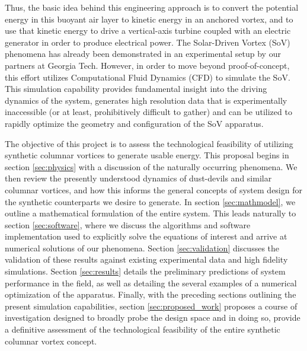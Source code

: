 Thus, the basic idea behind this engineering approach is to convert the 
potential energy in this buoyant air layer to kinetic energy in an
anchored vortex, and to use that kinetic energy to drive a
vertical-axis turbine coupled with an electric generator in order to
produce electrical power. 
The Solar-Driven Vortex (SoV) phenomena has already been demonstrated in
an experimental setup by our partners at Georgia Tech. However, in order to 
move beyond proof-of-concept, this effort utilizes Computational Fluid 
Dynamics (CFD) to simulate the SoV. This simulation capability provides 
fundamental insight into the 
driving dynamics of the system, generates high resolution data that is 
experimentally inaccessible (or at least, prohibitively difficult to gather) 
and can be utilized to rapidly optimize the geometry and configuration of 
the SoV apparatus. 


%
%

The objective of this project is to assess the technological feasibility of 
utilizing synthetic columnar vortices to generate usable energy. 
This proposal begins in section \ref{sec:physics} with a discussion of the 
naturally occurring phenomena. We then
review the presently understood dynamics of dust-devils and similar
columnar vortices, and how this informs the general concepts of system 
design for the synthetic counterparts we desire to generate. 
In section \ref{sec:mathmodel}, we outline a mathematical formulation of
the entire system. This leads naturally to section \ref{sec:software},
where we discuss the algorithms and software implementation used to
explicitly solve the equations of interest and arrive at numerical
solutions of our phenomena. Section \ref{sec:validation} discusses the
validation of these results against existing experimental data and high
fidelity simulations. Section \ref{sec:results} details the preliminary
predictions of system performance in the field, as well as detailing the 
several examples of a numerical optimization of the apparatus. Finally, with the 
preceding sections outlining the present simulation capabilities, 
section \ref{sec:proposed_work} proposes a course of investigation
designed to broadly probe the design space and in doing so, provide a
definitive assessment of the technological feasibility of the entire 
synthetic columnar vortex concept. 


